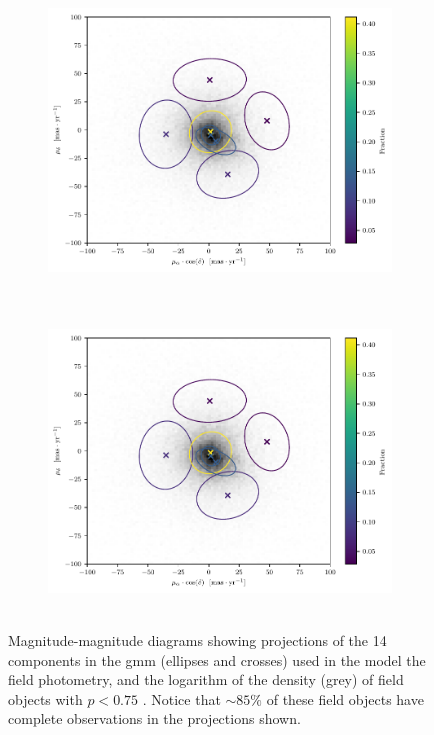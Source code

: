 \begin{figure}[ht!]
    \centering
    \begin{subfigure}[t]{0.48\textwidth}
        \includegraphics[page=7,height=8cm,width=\textwidth]{background/Figures/Field_GMM.pdf}
        \caption{}
    \end{subfigure}
    \begin{subfigure}[t]{0.48\textwidth}
      \includegraphics[page=8,height=8cm,width=\textwidth]{background/Figures/Field_GMM.pdf}
        \caption{}
     \end{subfigure}
\caption{Magnitude-magnitude diagrams showing projections of the 14 components in the \gls{gmm} (ellipses and crosses) used in the model the field photometry, and the logarithm of the density (grey) of field objects with $p <0.75$ \cite[according to][there are 98010 field objects]{Bouy2015}. Notice that $\sim85\%$ of these field objects have complete observations in the projections shown.}
\label{fig:fphGMM2}
\end{figure}

